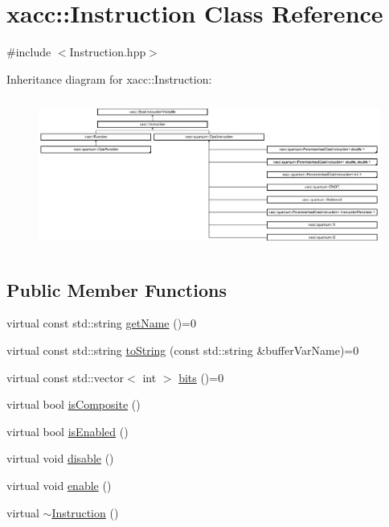 \hypertarget{a02460}{}\section{xacc\+:\+:Instruction Class Reference}
\label{a02460}


{\ttfamily \#include $<$Instruction.\+hpp$>$}

Inheritance diagram for xacc\+:\+:Instruction\+:\begin{figure}[H]
\begin{center}
\leavevmode
\includegraphics[height=5.008130cm]{a02460}
\end{center}
\end{figure}
\subsection*{Public Member Functions}
\begin{DoxyCompactItemize}
\item 
virtual const std\+::string \hyperlink{a02460_ac7ff23f693e2276edbf3fdac5452792c}{get\+Name} ()=0
\item 
virtual const std\+::string \hyperlink{a02460_ae94c2d089908294c1d410b14c96817ae}{to\+String} (const std\+::string \&buffer\+Var\+Name)=0
\item 
virtual const std\+::vector$<$ int $>$ \hyperlink{a02460_a819f32e94c3e1c9e69a0061aaf8d86dc}{bits} ()=0
\item 
virtual bool \hyperlink{a02460_a4383f1036d0fcfe890ab9c613dbd5f38}{is\+Composite} ()
\item 
virtual bool \hyperlink{a02460_ad02a1cf7220577124720b7a51424cea7}{is\+Enabled} ()
\item 
virtual void \hyperlink{a02460_a6e528da15e05a94cc1d7db268c483271}{disable} ()
\item 
virtual void \hyperlink{a02460_a0b4f2e5a591af28342a3c08e4305e24f}{enable} ()
\item 
virtual \hyperlink{a02460_ae22c935e8113bce63d1d0e214cda4d61}{$\sim$\+Instruction} ()
\end{DoxyCompactItemize}
